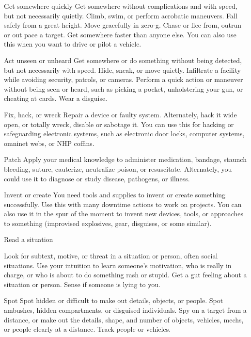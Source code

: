 Get somewhere quickly  
Get somewhere without complications and with speed, but not necessarily quietly. Climb, swim, or  
perform acrobatic maneuvers. Fall safely from a great height. Move gracefully in zero-g. Chase or  
flee from, outrun or out pace a target. Get somewhere faster than anyone else. You can also use  
this when you want to drive or pilot a vehicle.   

Act unseen or unheard  
Get somewhere or do something without being detected, but not necessarily with speed. Hide,  
sneak, or move quietly. Infiltrate a facility while avoiding security, patrols, or cameras. Perform a  
quick action or maneuver without being seen or heard, such as picking a pocket, unholstering  
your gun, or cheating at cards. Wear a disguise.  

Fix, hack, or wreck   
Repair a device or faulty system. Alternately, hack it wide open, or totally wreck, disable or  
sabotage it. You can use this for hacking or safeguarding electronic systems, such as electronic  
door locks, computer systems, omninet webs, or NHP coffins.  

Patch  
Apply your medical knowledge to administer medication, bandage, staunch bleeding, suture,  
cauterize, neutralize poison, or resuscitate. Alternately, you could use it to diagnose or study  
disease, pathogens, or illness.  

Invent or create  
You need tools and supplies to invent or create something successfully. Use this with many  
downtime actions to work on projects. You can also use it in the spur of the moment to invent new  
devices, tools, or approaches to something (improvised explosives, gear, disguises, or some  
similar).  

Read a situation  

                                                                                                                    


Look for subtext, motive, or threat in a situation or person, often social situations. Use your  
intuition to learn someone’s motivation, who is really in charge, or who is about to do something  
rash or stupid. Get a gut feeling about a situation or person. Sense if someone is lying to you.  

Spot  
Spot hidden or difficult to make out details, objects, or people. Spot ambushes, hidden  
compartments, or disguised individuals. Spy on a target from a distance, or make out the details,  
shape, and number of objects, vehicles, mechs, or people clearly at a distance. Track people or  
vehicles.  

